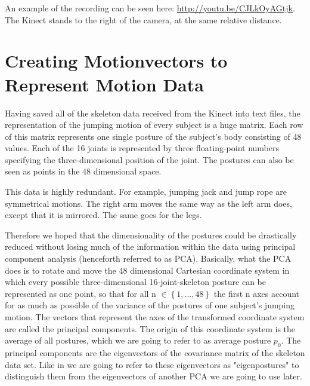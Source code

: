 \documentclass[a4paper]{article}
\begin{document}
An example of the recording can be seen here: \url{http://youtu.be/CJLkOyAGtjk}. The Kinect stands to the right of the camera, at the same relative distance.

\section{Creating Motionvectors to Represent Motion Data}

Having saved all of the skeleton data received from the Kinect into text files, the representation of the jumping motion of every subject is a huge matrix.
Each row of this matrix represents one single posture of the subject's body consisting of 48 values.
Each of the 16 joints is represented by three floating-point numbers specifying the three-dimensional position of the joint.
The postures can also be seen as points in the 48 dimensional space.

This data is highly redundant.
For example, jumping jack and jump rope are symmetrical motions.
The right arm moves the same way as the left arm does, except that it is mirrored.
The same goes for the legs.

Therefore we hoped that the dimensionality of the postures could be drastically reduced without losing much of the information within the data using principal component analysis (henceforth referred to as PCA).
Basically, what the PCA does is to rotate and move the 48 dimensional Cartesian coordinate system in which every possible three-dimensional 16-joint-skeleton posture can be represented as one point, so that for all n $\in \left\{1, ..., 48\right\}$ the first n axes account for as much as possible of the variance of the postures of one subject's jumping motion.
The vectors that represent the axes of the transformed coordinate system are called the principal components.
The origin of this coordinate system is the average of all postures, which we are going to refer to as average posture $p_{0}$.
The principal components are the eigenvectors of the covariance matrix of the skeleton data set.
Like in \cite{origin} we are going to refer to these eigenvectors as "eigenpostures" to distinguish them from the eigenvectors of another PCA we are going to use later.

\end{document}
